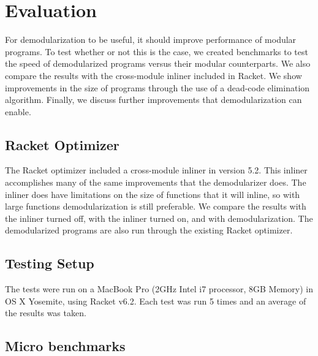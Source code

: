 \chapter{Evaluation}
\label{chap:evaluation}

For demodularization to be useful, it should improve performance of modular programs.
To test whether or not this is the case, we created benchmarks to test the speed of demodularized programs versus their modular counterparts.
We also compare the results with the cross-module inliner included in Racket.
We show improvements in the size of programs through the use of a dead-code elimination algorithm.
Finally, we discuss further improvements that demodularization can enable.

\section{Racket Optimizer}

The Racket optimizer included a cross-module inliner in version 5.2. 
This inliner accomplishes many of the same improvements that the demodularizer does.
The inliner does have limitations on the size of functions that it will inline, so with large functions demodularization is still preferable.
We compare the results with the inliner turned off, with the inliner turned on, and with demodularization.
The demodularized programs are also run through the existing Racket optimizer.

\section{Testing Setup}

The tests were run on a MacBook Pro (2GHz Intel i7 processor, 8GB Memory) in OS X Yosemite, using Racket v6.2. 
Each test was run 5 times and an average of the results was taken.

\section{Micro benchmarks}

